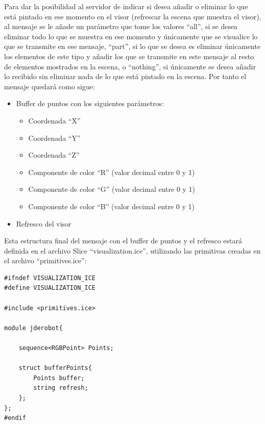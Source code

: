 Para dar la posibilidad al servidor de indicar si desea añadir o eliminar lo que está pintado en ese momento en el visor (refrescar la escena que muestra el visor), al mensaje se le añade un parámetro que tome los valores ``all'', si se desea eliminar todo lo que se muestra en ese momento y únicamente que se visualice lo que se transmite en ese mensaje, ``part'', si lo que se desea es eliminar únicamente los elementos de este tipo y añadir los que se transmite en este mensaje al resto de elementos mostrados en la escena, o ``nothing'', si únicamente se desea añadir lo recibido sin eliminar nada de lo que está pintado en la escena.
Por tanto el mensaje quedará como sigue:
\begin{itemize}
\item Buffer de puntos con los siguientes parámetros:
	\begin{itemize}
	\item Coordenada ``X''
	\item Coordenada ``Y''
	\item Coordenada ``Z''
	\item Componente de color ``R'' (valor decimal entre 0 y 1)
	\item Componente de color ``G'' (valor decimal entre 0 y 1)
	\item Componente de color ``B'' (valor decimal entre 0 y 1)
	\end{itemize}
\item Refresco del visor
\end{itemize}

Esta estructura final del mensaje con el buffer de puntos y el refresco estará definida en el archivo Slice ``visualization.ice'', utilizando las primitivas creadas en el archivo ``primitives.ice'':

\begin{lstlisting}[caption= Definición del buffer de puntos con Slice, label=cod.bufferptoslice]
#ifndef VISUALIZATION_ICE
#define VISUALIZATION_ICE

#include <primitives.ice>

module jderobot{

	sequence<RGBPoint> Points;

	struct bufferPoints{
		Points buffer;
		string refresh;
	};
};
#endif
\end{lstlisting}


